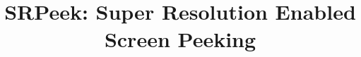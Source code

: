 \documentclass[conference]{IEEEtran}
\begin{document}
\title{SRPeek: Super Resolution Enabled Screen Peeking}




\maketitle







% 

















\end{document}

